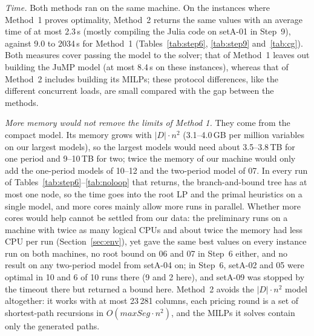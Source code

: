 \documentclass[conference]{IEEEtran}
\begin{document}
\emph{Time.} Both methods ran on the same machine. On the instances where Method~1 proves optimality, Method~2 returns the same values with an average time of at most 2.3\,s (mostly compiling the Julia code on setA-01 in Step~9), against 9.0 to 2034\,s for Method~1 (Tables~\ref{tab:step6}, \ref{tab:step9} and~\ref{tab:cg}). Both measures cover passing the model to the solver; that of Method~1 leaves out building the JuMP model (at most 8.4\,s on these instances), whereas that of Method~2 includes building its MILPs; these protocol differences, like the different concurrent loads, are small compared with the gap between the methods.

\emph{More memory would not remove the limits of Method 1.} They come from the compact model. Its memory grows with $|D|\cdot n^2$ (3.1--4.0\,GB per million variables on our largest models), so the largest models would need about 3.5--3.8\,TB for one period and 9--10\,TB for two; twice the memory of our machine would only add the one-period models of 10--12 and the two-period model of 07. In every run of Tables~\ref{tab:step6}--\ref{tab:noloop} that returns, the branch-and-bound tree has at most one node, so the time goes into the root LP and the primal heuristics on a single model, and more cores mainly allow more runs in parallel. Whether more cores would help cannot be settled from our data: the preliminary runs on a machine with twice as many logical CPUs and about twice the memory had less CPU per run (Section~\ref{sec:env}), yet gave the same best values on every instance run on both machines, no root bound on 06 and 07 in Step~6 either, and no result on any two-period model from setA-04 on; in Step~6, setA-02 and 05 were optimal in 10 and 6 of 10 runs there (9 and 2 here), and setA-09 was stopped by the timeout there but returned a bound here. Method~2 avoids the $|D|\cdot n^2$ model altogether: it works with at most 23\,281 columns, each pricing round is a set of shortest-path recursions in $O(maxSeg\cdot n^2)$, and the MILPs it solves contain only the generated paths.
\end{document}
